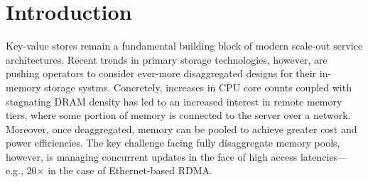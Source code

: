 \section{Introduction}
\label{sec:intro}

Key-value stores remain a fundamental building block of modern
scale-out service architectures.  Recent trends in primary storage
technologies, however, are pushing operators to consider ever-more
disaggregated designs for their in-memory storage systms.  Concretely,
increases in CPU core counts coupled with stagnating DRAM density has
led to an increased interest in remote memory tiers, where some
portion of memory is connected to the server over a network.
Moreover, once deaggregated, memory can be pooled to achieve greater
cost and power efficiencies.  The key challenge facing fully
disaggregate memory pools, however, is managing concurrent updates in
the face of high access latencies---e.g., 20$\times$ in the case of
Ethernet-based RDMA.

